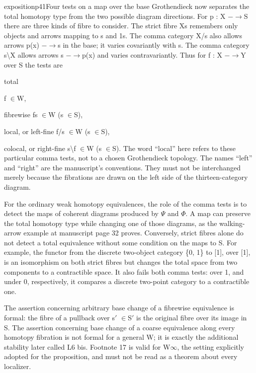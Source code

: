 \begin{dcomment}{exposition}{p41}{Four tests on a map over the base}
Grothendieck now separates the total homotopy type from the two possible diagram directions. For p : X \ensuremath{-}\ensuremath{\to}S there are three kinds of fibre to consider. The strict fibre Xs remembers only objects and arrows mapping to s and 1s. The comma category X/s also allows arrows p(x) \ensuremath{-}\ensuremath{\to}s in the base; it varies covariantly with s. The comma category s\textbackslash{}X allows arrows s \ensuremath{-}\ensuremath{\to}p(x) and varies contravariantly. Thus for f : X \ensuremath{-}\ensuremath{\to}Y over S the tests are

total

f \ensuremath{\in}W,

fibrewise fs \ensuremath{\in}W (s \ensuremath{\in}S),

local, or left-fine f/s \ensuremath{\in}W (s \ensuremath{\in}S),

colocal, or right-fine s\textbackslash{}f \ensuremath{\in}W (s \ensuremath{\in}S). The word “local” here refers to these particular comma tests, not to a chosen Grothendieck topology. The names “left” and “right” are the manuscript’s conventions. They must not be interchanged merely because the fibrations are drawn on the left side of the thirteen-category diagram.

For the ordinary weak homotopy equivalences, the role of the comma tests is to detect the maps of coherent diagrams produced by \ensuremath{\Psi} and \ensuremath{\Phi}. A map can preserve the total homotopy type while changing one of those diagrams, as the walking-arrow example at manuscript page 32 proves. Conversely, strict fibres alone do not detect a total equivalence without some condition on the maps to S. For example, the functor from the discrete two-object category \{0, 1\} to [1], over [1], is an isomorphism on both strict fibres but changes the total space from two components to a contractible space. It also fails both comma tests: over 1, and under 0, respectively, it compares a discrete two-point category to a contractible one.

The assertion concerning arbitrary base change of a fibrewise equivalence is formal: the fibre of a pullback over s\ensuremath{\prime} \ensuremath{\in}S\ensuremath{\prime} is the original fibre over its image in S. The assertion concerning base change of a coarse equivalence along every homotopy fibration is not formal for a general W; it is exactly the additional stability later called L6 bis. Footnote 17 is valid for W\ensuremath{\infty}, the setting explicitly adopted for the proposition, and must not be read as a theorem about every localizer.


\end{dcomment}
